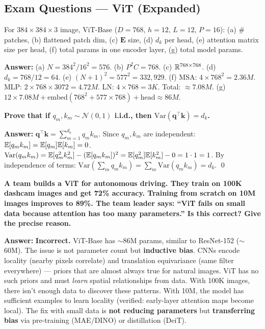 \subsection{Exam Questions — ViT (Expanded)}

\begin{examq}
For $384 \times 384 \times 3$ image, ViT-Base ($D{=}768$, $h{=}12$, $L{=}12$, $P{=}16$): (a) \# patches, (b) flattened patch dim, (c) $\mathbf{E}$ size, (d) $d_k$ per head, (e) attention matrix size per head, (f) total params in one encoder layer, (g) total model params.

\textbf{Answer:} (a) $N = 384^2/16^2 = 576$. (b) $P^2C = 768$. (c) $\mathbb{R}^{768 \times 768}$. (d) $d_k = 768/12 = 64$. (e) $(N{+}1)^2 = 577^2 = 332,929$. (f) MSA: $4 \times 768^2 = 2.36M$. MLP: $2 \times 768 \times 3072 = 4.72M$. LN: $4 \times 768 = 3K$. Total: $\approx 7.08M$. (g) $12 \times 7.08M + \text{embed}(768^2 + 577 \times 768) + \text{head} \approx 86M$.
\end{examq}

\begin{examq}
\textbf{Prove that if $q_m, k_m \sim \mathcal{N}(0,1)$ i.i.d., then $\text{Var}(\mathbf{q}^\top\mathbf{k}) = d_k$.}

\textbf{Answer:} $\mathbf{q}^\top\mathbf{k} = \sum_{m=1}^{d_k} q_m k_m$. Since $q_m, k_m$ are independent: $\mathbb{E}[q_m k_m] = \mathbb{E}[q_m]\mathbb{E}[k_m] = 0$. $\text{Var}(q_m k_m) = \mathbb{E}[q_m^2 k_m^2] - (\mathbb{E}[q_m k_m])^2 = \mathbb{E}[q_m^2]\mathbb{E}[k_m^2] - 0 = 1 \cdot 1 = 1$. By independence of terms: $\text{Var}(\sum_m q_m k_m) = \sum_m \text{Var}(q_m k_m) = d_k$. \qed
\end{examq}

\begin{examq}
\textbf{A team builds a ViT for autonomous driving. They train on 100K dashcam images and get 72\% accuracy. Training from scratch on 10M images improves to 89\%. The team leader says: ``ViT fails on small data because attention has too many parameters.'' Is this correct? Give the precise reason.}

\textbf{Answer:} \textbf{Incorrect.} ViT-Base has $\sim$86M params, similar to ResNet-152 ($\sim$60M). The issue is not parameter count but \textbf{inductive bias}. CNNs encode locality (nearby pixels correlate) and translation equivariance (same filter everywhere) — priors that are almost always true for natural images. ViT has no such priors and must \emph{learn} spatial relationships from data. With 100K images, there isn't enough data to discover these patterns. With 10M, the model has sufficient examples to learn locality (verified: early-layer attention maps become local). The fix with small data is \textbf{not reducing parameters} but \textbf{transferring bias} via pre-training (MAE/DINO) or distillation (DeiT).
\end{examq}

